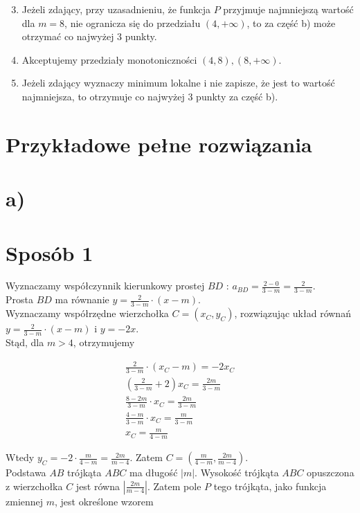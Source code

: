 \documentclass[10pt]{article}
\begin{document}
\begin{enumerate}
  \setcounter{enumi}{2}
  \item Jeżeli zdający, przy uzasadnieniu, że funkcja $P$ przyjmuje najmniejszą wartość dla $m=8$, nie ogranicza się do przedziału $(4,+\infty)$, to za część b) może otrzymać co najwyżej 3 punkty.
  \item Akceptujemy przedziały monotoniczności $(4,8),(8,+\infty)$.
  \item Jeżeli zdający wyznaczy minimum lokalne i nie zapisze, że jest to wartość najmniejsza, to otrzymuje co najwyżej 3 punkty za część b).
\end{enumerate}

\section*{Przykładowe pełne rozwiązania}
\section*{a)}
\section*{Sposób 1}
Wyznaczamy współczynnik kierunkowy prostej $B D$ : $a_{B D}=\frac{2-0}{3-m}=\frac{2}{3-m}$.\\
Prosta $B D$ ma równanie $y=\frac{2}{3-m} \cdot(x-m)$.\\
Wyznaczamy współrzędne wierzchołka $C=\left(x_{C}, y_{C}\right)$, rozwiązując układ równań\\
$y=\frac{2}{3-m} \cdot(x-m)$ i $y=-2 x$.\\
Stąd, dla $m>4$, otrzymujemy

$$
\begin{gathered}
\frac{2}{3-m} \cdot\left(x_{C}-m\right)=-2 x_{C} \\
\left(\frac{2}{3-m}+2\right) x_{C}=\frac{2 m}{3-m} \\
\frac{8-2 m}{3-m} \cdot x_{C}=\frac{2 m}{3-m} \\
\frac{4-m}{3-m} \cdot x_{C}=\frac{m}{3-m} \\
x_{C}=\frac{m}{4-m}
\end{gathered}
$$

Wtedy $y_{C}=-2 \cdot \frac{m}{4-m}=\frac{2 m}{m-4}$. Zatem $C=\left(\frac{m}{4-m}, \frac{2 m}{m-4}\right)$.\\
Podstawa $A B$ trójkąta $A B C$ ma długość $|m|$. Wysokość trójkąta $A B C$ opuszczona z wierzchołka $C$ jest równa $\left|\frac{2 m}{m-4}\right|$. Zatem pole $P$ tego trójkąta, jako funkcja zmiennej $m$, jest określone wzorem
\end{document}
